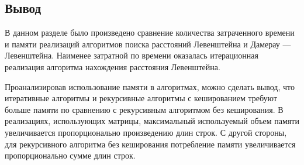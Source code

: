 
\newpage

\subsection*{Вывод}

В данном разделе было произведено сравнение количества затраченного времени и памяти реализаций алгоритмов поиска расстояний Левенштейна и Дамерау --- Левенштейна. Наименее затратной по времени оказалась итерационная реализация алгоритма нахождения расстояния Левенштейна.

Проанализировав использование памяти в алгоритмах, можно сделать вывод, что итеративные алгоритмы и рекурсивные алгоритмы с кешированием требуют больше памяти по сравнению с рекурсивным алгоритмом без кеширования.
В реализациях, использующих матрицы, максимальный используемый объем памяти увеличивается пропорционально произведению длин строк.
С другой стороны, для рекурсивного алгоритма без кеширования потребление памяти увеличивается пропорционально сумме длин строк.
